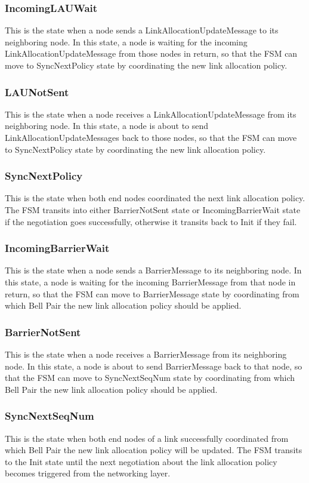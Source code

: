 \subsubsection{IncomingLAUWait}
This is the state when a node sends a LinkAllocationUpdateMessage to its neighboring node. 
In this state, a node is waiting for the incoming LinkAllocationUpdateMessage from those nodes in return, 
so that the FSM can move to SyncNextPolicy state by coordinating the new link allocation policy.

\subsubsection{LAUNotSent}
This is the state when a node receives a LinkAllocationUpdateMessage from its neighboring node. 
In this state, a node is about to send LinkAllocationUpdateMessages back to those nodes, so that the FSM can move to SyncNextPolicy state by coordinating the new link allocation policy.

\subsubsection{SyncNextPolicy}
This is the state when both end nodes coordinated the next link allocation policy.
The FSM transits into either BarrierNotSent state or IncomingBarrierWait state if the negotiation goes successfully, otherwise it transits back to Init if they fail.

\subsubsection{IncomingBarrierWait}
This is the state when a node sends a BarrierMessage to its neighboring node. 
In this state, a node is waiting for the incoming BarrierMessage from that node in return, 
so that the FSM can move to BarrierMessage state by coordinating from which Bell Pair the new link allocation policy should be applied.

\subsubsection{BarrierNotSent}
This is the state when a node receives a BarrierMessage from its neighboring node. 
In this state, a node is about to send BarrierMessage back to that node, 
so that the FSM can move to SyncNextSeqNum state by coordinating from which Bell Pair the new link allocation policy should be applied.

\subsubsection{SyncNextSeqNum}
This is the state when both end nodes of a link successfully coordinated from which Bell Pair the new link allocation policy will be updated.
The FSM transits to the Init state until the next negotiation about the link allocation policy becomes triggered from the networking layer.

